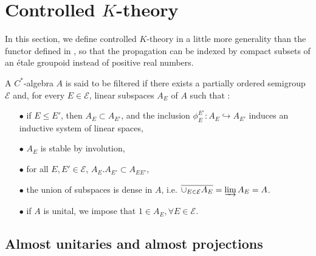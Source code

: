 \section{Controlled $K$-theory}

In this section, we define controlled $K$-theory in a little more generality than the functor defined in \cite{OY2}, so that the propagation can be indexed by compact subsets of an étale groupoid instead of positive real numbers.\\

\begin{definition}
A $C^*$-algebra $A$ is said to be filtered if there exists a partially ordered semigroup $\mathcal E$ and, for every $E\in \mathcal E$, linear subspaces $A_E$ of $A$ such that :\\
\begin{itemize}
\item[$\bullet$] if $E \leq E'$, then $A_E\subset A_{E'}$, and the inclusion $\phi_E^{E'}: A_E\hookrightarrow A_{E'}$ induces an inductive system of linear spaces,
\item[$\bullet$] $A_E$ is stable by involution,
\item[$\bullet$] for all $E,E'\in\mathcal E$, $A_E.A_{E'}\subset A_{EE'}$,
\item[$\bullet$] the union of subspaces is dense in $A$, i.e. $\overline{\cup_{E\in\mathcal E}A_E} = \varinjlim A_E = A$.
\item[$\bullet$] if $A$ is unital, we impose that $1\in A_E,\forall E\in\mathcal E$.\\
\end{itemize}
\end{definition}

\subsection{Almost unitaries and almost projections}

